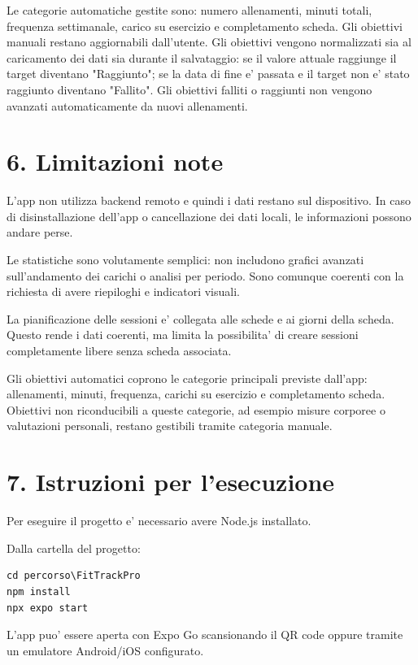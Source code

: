 \documentclass[11pt,a4paper]{article}
\begin{document}
Le categorie automatiche gestite sono: numero allenamenti, minuti totali, frequenza settimanale, carico su esercizio e completamento scheda. Gli obiettivi manuali restano aggiornabili dall'utente. Gli obiettivi vengono normalizzati sia al caricamento dei dati sia durante il salvataggio: se il valore attuale raggiunge il target diventano "Raggiunto"; se la data di fine e' passata e il target non e' stato raggiunto diventano "Fallito". Gli obiettivi falliti o raggiunti non vengono avanzati automaticamente da nuovi allenamenti.

\section{6. Limitazioni note}

L'app non utilizza backend remoto e quindi i dati restano sul dispositivo. In caso di disinstallazione dell'app o cancellazione dei dati locali, le informazioni possono andare perse.

Le statistiche sono volutamente semplici: non includono grafici avanzati sull'andamento dei carichi o analisi per periodo. Sono comunque coerenti con la richiesta di avere riepiloghi e indicatori visuali.

La pianificazione delle sessioni e' collegata alle schede e ai giorni della scheda. Questo rende i dati coerenti, ma limita la possibilita' di creare sessioni completamente libere senza scheda associata.

Gli obiettivi automatici coprono le categorie principali previste dall'app: allenamenti, minuti, frequenza, carichi su esercizio e completamento scheda. Obiettivi non riconducibili a queste categorie, ad esempio misure corporee o valutazioni personali, restano gestibili tramite categoria manuale.

\section{7. Istruzioni per l'esecuzione}

Per eseguire il progetto e' necessario avere Node.js installato.

Dalla cartella del progetto:

\begin{lstlisting}
cd percorso\FitTrackPro
npm install
npx expo start
\end{lstlisting}

L'app puo' essere aperta con Expo Go scansionando il QR code oppure tramite un emulatore Android/iOS configurato.
\end{document}
